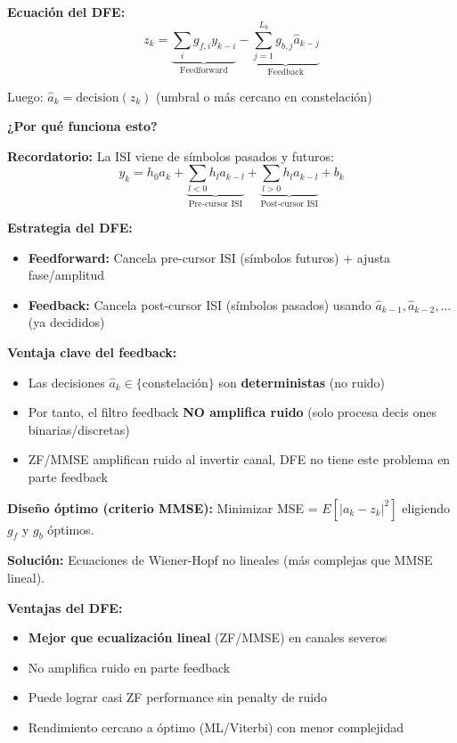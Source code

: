 \documentclass[10pt,a4paper]{article}
\begin{document}
\textbf{Ecuación del DFE:}
$$\boxed{z_k = \underbrace{\sum_i g_{f,i} y_{k-i}}_{\text{Feedforward}} - \underbrace{\sum_{j=1}^{L_b} g_{b,j} \hat{a}_{k-j}}_{\text{Feedback}}}$$

Luego: $\hat{a}_k = \text{decision}(z_k)$ (umbral o más cercano en constelación)

\textbf{¿Por qué funciona esto?}

\begin{tcolorbox}[colback=verdeclaro!10,colframe=verdeclaro,title=💡 Intuición del DFE]
\textbf{Recordatorio:} La ISI viene de símbolos pasados y futuros:
$$y_k = h_0 a_k + \underbrace{\sum_{l<0} h_l a_{k-l}}_{\text{Pre-cursor ISI}} + \underbrace{\sum_{l>0} h_l a_{k-l}}_{\text{Post-cursor ISI}} + b_k$$

\textbf{Estrategia del DFE:}
\begin{itemize}
\item \textbf{Feedforward:} Cancela pre-cursor ISI (símbolos futuros) + ajusta fase/amplitud
\item \textbf{Feedback:} Cancela post-cursor ISI (símbolos pasados) usando $\hat{a}_{k-1}, \hat{a}_{k-2}, \ldots$ (ya decididos)
\end{itemize}

\textbf{Ventaja clave del feedback:}
\begin{itemize}
\item Las decisiones $\hat{a}_k \in \{$constelación$\}$ son \textbf{deterministas} (no ruido)
\item Por tanto, el filtro feedback \textbf{NO amplifica ruido} (solo procesa decis ones binarias/discretas)
\item ZF/MMSE amplifican ruido al invertir canal, DFE no tiene este problema en parte feedback
\end{itemize}
\end{tcolorbox}

\textbf{Diseño óptimo (criterio MMSE):}
Minimizar MSE = $E[|a_k - z_k|^2]$ eligiendo $g_f$ y $g_b$ óptimos.

\textbf{Solución:} Ecuaciones de Wiener-Hopf no lineales (más complejas que MMSE lineal).

\textbf{Ventajas del DFE:}
\begin{itemize}
\item \textbf{Mejor que ecualización lineal} (ZF/MMSE) en canales severos
\item No amplifica ruido en parte feedback
\item Puede lograr casi ZF performance sin penalty de ruido
\item Rendimiento cercano a óptimo (ML/Viterbi) con menor complejidad
\end{itemize}
\end{document}
